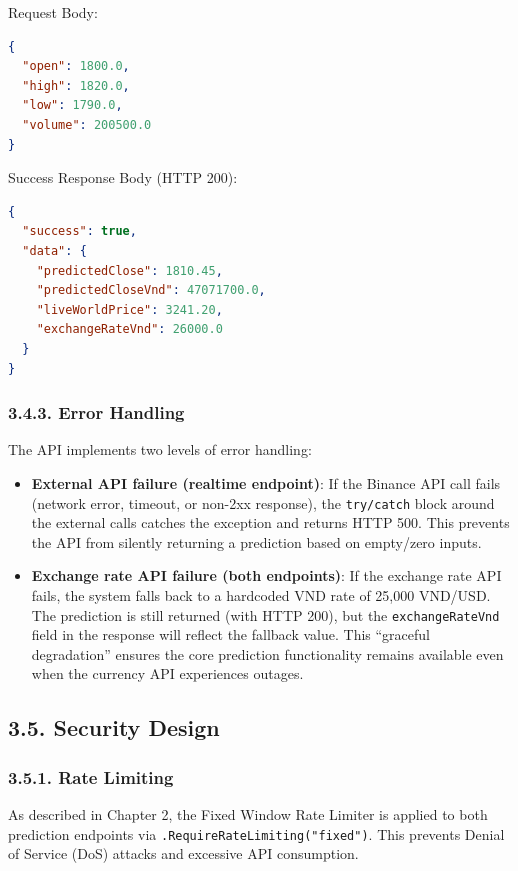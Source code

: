 Request Body:
\begin{lstlisting}[language=json, numbers=none]
{
  "open": 1800.0,
  "high": 1820.0,
  "low": 1790.0,
  "volume": 200500.0
}
\end{lstlisting}

Success Response Body (HTTP 200):
\begin{lstlisting}[language=json, numbers=none]
{
  "success": true,
  "data": {
    "predictedClose": 1810.45,
    "predictedCloseVnd": 47071700.0,
    "liveWorldPrice": 3241.20,
    "exchangeRateVnd": 26000.0
  }
}
\end{lstlisting}

\subsubsection{3.4.3. Error Handling}
The API implements two levels of error handling:

\begin{itemize}
  \item \textbf{External API failure (realtime endpoint)}: If the Binance API call fails (network error, timeout, or non-2xx response), the \texttt{try/catch} block around the external calls catches the exception and returns HTTP 500. This prevents the API from silently returning a prediction based on empty/zero inputs.
  \item \textbf{Exchange rate API failure (both endpoints)}: If the exchange rate API fails, the system falls back to a hardcoded VND rate of 25,000 VND/USD. The prediction is still returned (with HTTP 200), but the \texttt{exchangeRateVnd} field in the response will reflect the fallback value. This ``graceful degradation'' ensures the core prediction functionality remains available even when the currency API experiences outages.
\end{itemize}

\subsection{3.5. Security Design}

\subsubsection{3.5.1. Rate Limiting}
As described in Chapter 2, the Fixed Window Rate Limiter is applied to both prediction endpoints via \texttt{.RequireRateLimiting("fixed")}. This prevents Denial of Service (DoS) attacks and excessive API consumption.

